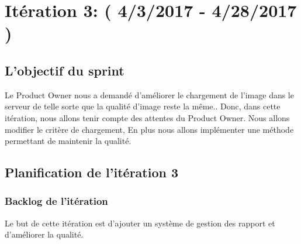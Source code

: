 \section{Itération 3: ( 4/3/2017 - 4/28/2017 )}

\subsection{L'objectif du sprint}
Le Product Owner nous a demandé d’améliorer le chargement de l'image 
dans le serveur de telle sorte que la qualité d'image reste la même..
Donc, dans cette itération, nous allons tenir compte des attentes du Product Owner. Nous allons
modifier le critère de chargement, En plus nous allons implémenter une méthode
permettant de maintenir la qualité.

\subsection{Planification de l'itération 3}

\subsubsection{Backlog de l'itération}

Le but de cette itération est d'ajouter un système de gestion des rapport et d'améliorer
la qualité.


